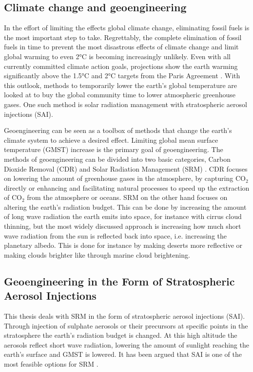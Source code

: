 \subsection{Climate change and geoengineering}
In the effort of limiting the effects global climate change, eliminating fossil fuels is the most important step to take. Regrettably, the complete elimination of fossil fuels in time to prevent the most disastrous effects of climate change and limit global warming to even 2°C is becoming increasingly unlikely. Even with all currently committed climate action goals, projections show the earth warming significantly above the 1.5°C and 2°C targets from the Paris Agreement \parencite{NDCsynth}. With this outlook, methods to temporarily lower the earth's global temperature are looked at to buy the global community time to lower atmospheric greenhouse gases. One such method is solar radiation management with stratospheric aerosol injections (SAI). 

Geoengineering can be seen as a toolbox of methods that change the earth's climate system to achieve a desired effect. Limiting global mean surface temperature (GMST) increase is the primary goal of geoengineering. The methods of geoengineering can be divided into two basic categories, Carbon Dioxide Removal (CDR) and Solar Radiation Management (SRM) \parencite{shepherd2009}. CDR focuses on lowering the amount of greenhouse gases in the atmosphere, by capturing CO$_2$ directly or enhancing and facilitating natural processes to speed up the extraction of CO$_2$ from the atmosphere or oceans. SRM on the other hand focuses on altering the earth's radiation budget. This can be done by increasing the amount of long wave radiation the earth emits into space, for instance with cirrus cloud thinning, but the most widely discussed approach is increasing how much short wave radiation from the sun is reflected back into space, i.e. increasing the planetary albedo. This is done for instance by making deserts more reflective or making clouds brighter like through marine cloud brightening. 

\subsection{Geoengineering in the Form of Stratospheric Aerosol Injections}
This thesis deals with SRM in the form of stratospheric aerosol injections (SAI). Through injection of sulphate aerosols or their precursors at specific points in the stratosphere the earth's radiation budget is changed. At this high altitude the aerosols reflect short wave radiation, lowering the amount of sunlight reaching the earth's surface and GMST is lowered. It has been argued that SAI is one of the most feasible options for SRM \parencite{lenton2009,shepherd2009}.

